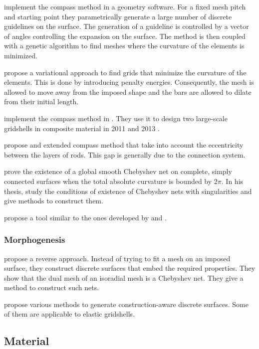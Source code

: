  implement the compass method in a geometry software. For a fixed mesh pitch and starting point they parametrically generate a large number of discrete guidelines on the surface. The generation of a guideline is controlled by a vector of angles controlling the expansion on the surface. The method is then coupled with a genetic algorithm to find meshes where the curvature of the elements is minimized.

 propose a variational approach to find grids that minimize the curvature of the elements. This is done by introducing penalty energies. Consequently, the mesh is allowed to move away from the imposed shape and the bars are allowed to dilate from their initial length.

 implement the compass method in \grasshopper{}. They use it to design two large-scale gridshells in composite material in 2011 \cite{Baverel2012} and 2013 \Cite{DuPeloux2016}.

 propose and extended compass method that take into account the eccentricity between the layers of rods. This gap is generally due to the connection system.

 prove the existence of a global smooth Chebyshev net on complete, simply connected surfaces when the total absolute curvature is bounded by $2\pi$. In his thesis,  study the conditions of existence of Chebyshev nets with singularities and give methods to construct them.

 propose a tool similar to the ones developed by  and .

\subsubsection{Morphogenesis}

 propose a reverse approach. Instead of trying to fit a mesh on an imposed surface, they construct discrete surfaces that embed the required properties. They show that the dual mesh of an isoradial mesh is a Chebyshev net. They give a method to construct such nets.

 propose various methods to generate construction-aware discrete surfaces. Some of them are applicable to elastic gridshells.

\subsection{Material}

